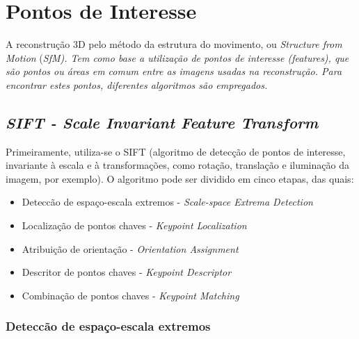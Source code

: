 \chapter{Pontos de Interesse}\label{sec:pontosdeinteresse}
%
A reconstrução 3D pelo método da estrutura do movimento, ou {\it Structure from Motion} (\it{SfM}). Tem como base a utilização de pontos de interesse
(\it features), que são pontos ou áreas em comum entre as imagens usadas na reconstrução. Para encontrar estes pontos, diferentes algoritmos são empregados.

\section {{\it SIFT - Scale Invariant Feature Transform}}

Primeiramente, utiliza-se o SIFT (algoritmo de detecção de pontos de interesse, invariante à escala e à transformações, como rotação, translação e iluminação da imagem, por exemplo).
O algoritmo pode ser dividido em cinco etapas, das quais:

\begin{itemize}
	\item{Deteccão de espaço-escala extremos - {\it Scale-space Extrema Detection}}
	\item{Localização de pontos chaves - {\it Keypoint Localization}}
	\item{Atribuição de orientação - {\it Orientation Assignment}}
	\item{Descritor de pontos chaves - {\it Keypoint Descriptor}}
	\item{Combinação de pontos chaves - {\it Keypoint Matching}}
\end{itemize}


\subsection{Deteccão de espaço-escala extremos}


